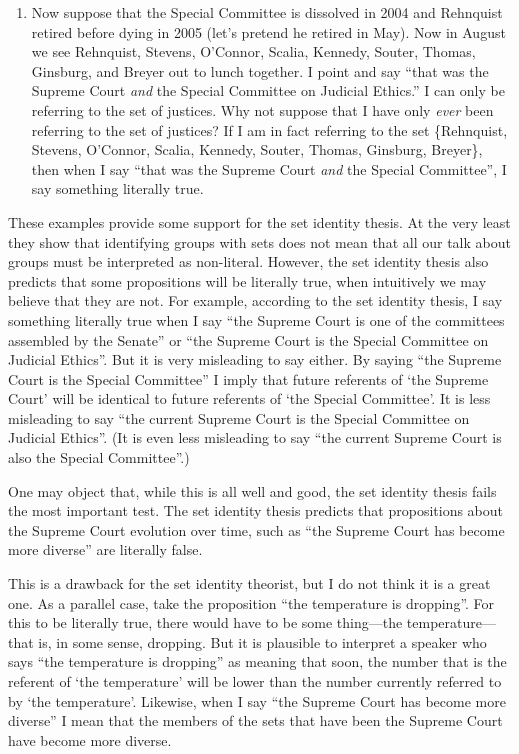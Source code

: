 \documentclass[11pt]{article}
\begin{document}
\begin{spacing}{1.5}
\begin{enumerate}
  \item Now suppose that the Special Committee is dissolved in 2004
    and Rehnquist retired before dying in 2005 (let's pretend he
    retired in May).  Now in August we see Rehnquist, Stevens,
    O'Connor, Scalia, Kennedy, Souter, Thomas, Ginsburg, and Breyer
    out to lunch together.  I point and say ``that was the Supreme
    Court {\em and} the Special Committee on Judicial Ethics.''  I can
    only be referring to the set of justices.  Why not suppose that I
    have only {\em ever} been referring to the set of justices?  If I
    am in fact referring to the set \{Rehnquist, Stevens, O'Connor,
    Scalia, Kennedy, Souter, Thomas, Ginsburg, Breyer\}, then when I
    say ``that was the Supreme Court {\em and} the Special
    Committee'', I say something literally true.
\end{enumerate}

These examples provide some support for the set identity thesis.  At
the very least they show that identifying groups with sets does not
mean that all our talk about groups must be interpreted as
non-literal.  However, the set identity thesis also predicts that some
propositions will be literally true, when intuitively we may believe
that they are not.  For example, according to the set identity thesis,
I say something literally true when I say ``the Supreme Court is one
of the committees assembled by the Senate'' or ``the Supreme Court is
the Special Committee on Judicial Ethics''.  But it is very misleading
to say either.  By saying ``the Supreme Court is the Special
Committee'' I imply that future referents of `the Supreme Court' will
be identical to future referents of `the Special Committee'.  It is
less misleading to say ``the current Supreme Court is the Special
Committee on Judicial Ethics''.  (It is even less misleading to say
``the current Supreme Court is also the Special Committee''.)

One may object that, while this is all well and good, the set identity
thesis fails the most important test.  The set identity thesis
predicts that propositions about the Supreme Court evolution over
time, such as ``the Supreme Court has become more diverse'' are
literally false.

This is a drawback for the set identity theorist, but I do not think
it is a great one.  As a parallel case, take the proposition ``the
temperature is dropping''.  For this to be literally true, there would
have to be some thing---the temperature---that is, in some sense,
dropping.  But it is plausible to interpret a speaker who says ``the
temperature is dropping'' as meaning that soon, the number that is the
referent of `the temperature' will be lower than the number currently
referred to by `the temperature'.  Likewise, when I say ``the Supreme
Court has become more diverse'' I mean that the members of the sets
that have been the Supreme Court have become more diverse.


\end{spacing}
\end{document}
